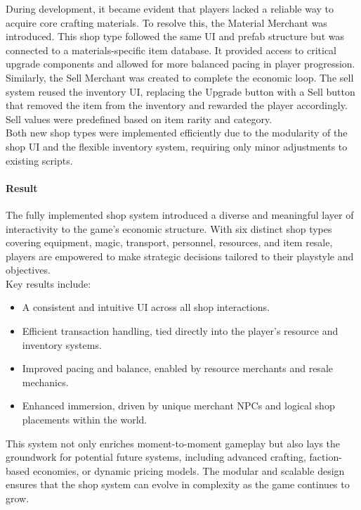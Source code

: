\documentclass{article}
\begin{document}
During development, it became evident that players lacked a reliable way to acquire core crafting materials. To resolve this, the Material Merchant was introduced. This shop type followed the same UI and prefab structure but was connected to a materials-specific item database. It provided access to critical upgrade components and allowed for more balanced pacing in player progression.\\

Similarly, the Sell Merchant was created to complete the economic loop. The sell system reused the inventory UI, replacing the Upgrade button with a Sell button that removed the item from the inventory and rewarded the player accordingly. Sell values were predefined based on item rarity and category.\\

Both new shop types were implemented efficiently due to the modularity of the shop UI and the flexible inventory system, requiring only minor adjustments to existing scripts.

\paragraph{Result}\hfill

The fully implemented shop system introduced a diverse and meaningful layer of interactivity to the game's economic structure. With six distinct shop types covering equipment, magic, transport, personnel, resources, and item resale, players are empowered to make strategic decisions tailored to their playstyle and objectives.\\

Key results include:
\begin{itemize}
    \item A consistent and intuitive UI across all shop interactions.
    \item Efficient transaction handling, tied directly into the player's resource and inventory systems.
    \item Improved pacing and balance, enabled by resource merchants and resale mechanics.
    \item Enhanced immersion, driven by unique merchant NPCs and logical shop placements within the world.
\end{itemize}

This system not only enriches moment-to-moment gameplay but also lays the groundwork for potential future systems, including advanced crafting, faction-based economies, or dynamic pricing models. The modular and scalable design ensures that the shop system can evolve in complexity as the game continues to grow.
\end{document}
